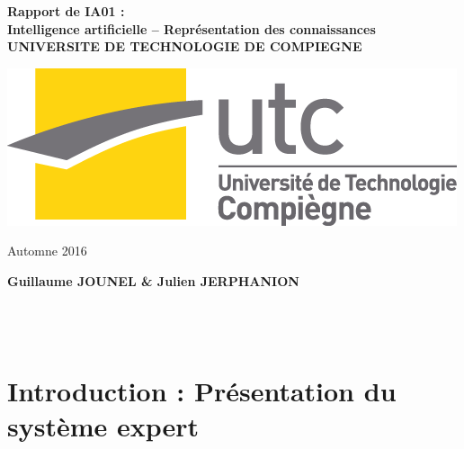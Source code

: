\documentclass[a4paper,12pt]{article}
\begin{document}
\thispagestyle{empty}

{\large

\vspace*{1cm}

\begin{center}

	{\bf Rapport de IA01 : \\Intelligence artificielle -- Représentation des connaissances}
	\vspace*{1cm}
	{\bf \\UNIVERSITE DE TECHNOLOGIE DE COMPIEGNE}

	\vspace*{1cm}
	\includegraphics[scale=0.6]{UTC_logo.png}
	\vspace*{1cm}

	Automne 2016

	\vspace*{1cm}

	\vspace*{1cm}
	{\Large {\bf Guillaume JOUNEL \& Julien JERPHANION}}

	\vspace*{2 cm}
\end{center}


\vspace*{1 cm}
\\

\vspace*{1 cm}
\\
}

\newpage
\tableofcontents
\newpage
\listoflistings
\newpage

\section{Introduction : Présentation du système expert}
\end{document}
